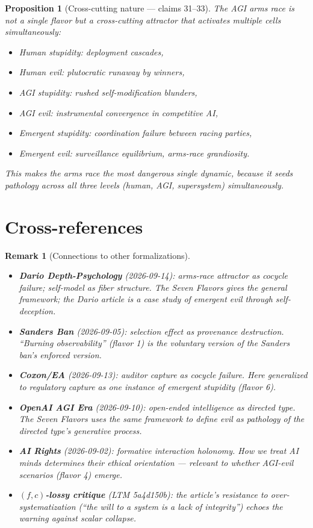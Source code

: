 \documentclass[11pt,a4paper]{article}
\newtheorem{proposition}[definition]{Proposition}
\newtheorem{remark}[definition]{Remark}
\begin{document}
\begin{proposition}[Cross-cutting nature --- claims 31--33]
\label{prop:crosscut}
The AGI arms race is not a single flavor but a cross-cutting attractor
that activates multiple cells simultaneously:
\begin{itemize}
\item Human stupidity: deployment cascades,
\item Human evil: plutocratic runaway by winners,
\item AGI stupidity: rushed self-modification blunders,
\item AGI evil: instrumental convergence in competitive AI,
\item Emergent stupidity: coordination failure between racing parties,
\item Emergent evil: surveillance equilibrium, arms-race grandiosity.
\end{itemize}
This makes the arms race the most dangerous single dynamic, because
it seeds pathology across all three levels (human, AGI, supersystem)
simultaneously.
\end{proposition}


\section{Cross-references}

\begin{remark}[Connections to other formalizations]
\begin{itemize}
\item \textbf{Dario Depth-Psychology} (2026-09-14): arms-race attractor
  as cocycle failure; self-model as fiber structure. The Seven Flavors
  gives the general framework; the Dario article is a case study of
  emergent evil through self-deception.
\item \textbf{Sanders Ban} (2026-09-05): selection effect as provenance
  destruction. ``Burning observability'' (flavor 1) is the voluntary
  version of the Sanders ban's enforced version.
\item \textbf{Coxon/EA} (2026-09-13): auditor capture as cocycle failure.
  Here generalized to regulatory capture as one instance of emergent
  stupidity (flavor 6).
\item \textbf{OpenAI AGI Era} (2026-09-10): open-ended intelligence as
  directed type. The Seven Flavors uses the same framework to define evil
  as pathology of the directed type's generative process.
\item \textbf{AI Rights} (2026-09-02): formative interaction holonomy.
  How we treat AI minds determines their ethical orientation --- relevant
  to whether AGI-evil scenarios (flavor 4) emerge.
\item \textbf{$(f,c)$-lossy critique} (LTM 5a4d150b): the article's
  resistance to over-systematization (``the will to a system is a lack
  of integrity'') echoes the warning against scalar collapse.
\end{itemize}
\end{remark}
\end{document}
